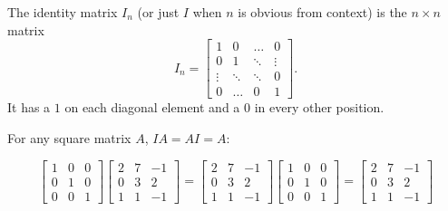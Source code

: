 \begin{definition}
The identity matrix $I_n$ (or just $I$ when $n$ is obvious from context) is  the $n \times n$ matrix $$I_n = \begin{bmatrix} 1 & 0  & \hdots & 0 \\ 0 & 1 & \ddots & \vdots  \\ \vdots & \ddots & \ddots & 0 \\ 0 & \hdots & 0 & 1 \end{bmatrix}.$$
It has a $1$ on each diagonal element and a $0$ in every other position.
\end{definition}

\begin{fact}
  For any square matrix \(A\), \(IA=AI=A\):

  \[
    \begin{bmatrix} 1 & 0 & 0 \\ 0 & 1 & 0 \\ 0 & 0 & 1 \end{bmatrix}
    \begin{bmatrix} 2 & 7 & -1 \\ 0 & 3 & 2 \\ 1 & 1 & -1 \end{bmatrix}
  =
    \begin{bmatrix} 2 & 7 & -1 \\ 0 & 3 & 2 \\ 1 & 1 & -1 \end{bmatrix}
      \begin{bmatrix} 1 & 0 & 0 \\ 0 & 1 & 0 \\ 0 & 0 & 1 \end{bmatrix}
  =
    \begin{bmatrix} 2 & 7 & -1 \\ 0 & 3 & 2 \\ 1 & 1 & -1 \end{bmatrix}
  \]
\end{fact}

